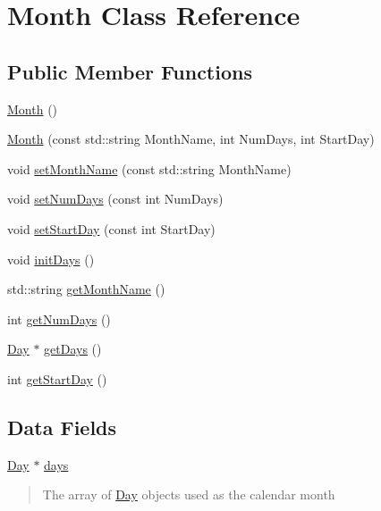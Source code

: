 \hypertarget{classMonth}{\section{Month Class Reference}
\label{classMonth}
}
\subsection*{Public Member Functions}
\begin{DoxyCompactItemize}
\item 
\hyperlink{classMonth_a36882c55ece9c4210ec1b01bd665ec89}{Month} ()
\item 
\hyperlink{classMonth_ae2b064f3abf4c38a9e2527920831ed3f}{Month} (const std\-::string Month\-Name, int Num\-Days, int Start\-Day)
\item 
void \hyperlink{classMonth_a77dee92af5de872d8579b1b142473f90}{set\-Month\-Name} (const std\-::string Month\-Name)
\item 
void \hyperlink{classMonth_a661a751213b495884ec258d3e6c687e9}{set\-Num\-Days} (const int Num\-Days)
\item 
void \hyperlink{classMonth_ae9730715451148a5a4629b9c450e8103}{set\-Start\-Day} (const int Start\-Day)
\item 
void \hyperlink{classMonth_a9309f01ffc97e5bbb13bf8f5801f2aec}{init\-Days} ()
\item 
std\-::string \hyperlink{classMonth_a1cb2ba2c0e646b961f55d99e9f5b74de}{get\-Month\-Name} ()
\item 
int \hyperlink{classMonth_a5ab8e306d9f603872dcf68b7bc771aa0}{get\-Num\-Days} ()
\item 
\hyperlink{classDay}{Day} $\ast$ \hyperlink{classMonth_ab562a3d12216892324cfcfb2ba9503a6}{get\-Days} ()
\item 
int \hyperlink{classMonth_a5fd5d2bf55df35f09262198e416e1906}{get\-Start\-Day} ()
\end{DoxyCompactItemize}
\subsection*{Data Fields}
\begin{DoxyCompactItemize}
\item 
\hypertarget{classMonth_a8ade9e4309247818f04ce3e7f7682d6f}{\hyperlink{classDay}{Day} $\ast$ \hyperlink{classMonth_a8ade9e4309247818f04ce3e7f7682d6f}{days}}\label{classMonth_a8ade9e4309247818f04ce3e7f7682d6f}

\begin{DoxyCompactList}\small\item\em \begin{quotation}
The array of \hyperlink{classDay}{Day} objects used as the calendar month \end{quotation}
\end{DoxyCompactList}\end{DoxyCompactItemize}



